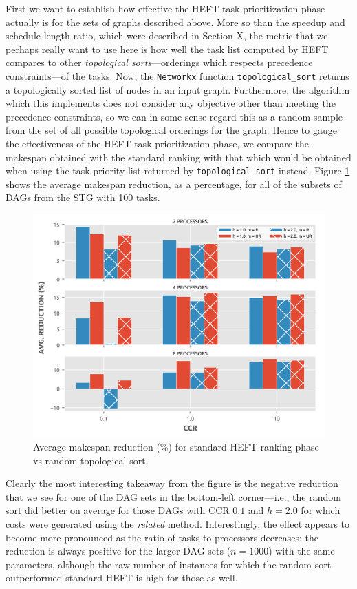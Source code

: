 \documentclass[12pt]{article}
\begin{document}
First we want to establish how effective the HEFT task prioritization phase actually is for the sets of graphs described above. More so than the speedup and schedule length ratio, which were described in Section X, the metric that we perhaps really want to use here is how well the task list computed by HEFT compares to other {\em topological sorts}---orderings which respects precedence constraints---of the tasks. Now, the {\tt Networkx} function {\tt topological\_sort} returns a topologically sorted list of nodes in an input graph. Furthermore, the algorithm which this implements does not consider any objective other than meeting the precedence constraints, so we can in some sense regard this as a random sample from the set of all possible topological orderings for the graph. Hence to gauge the effectiveness of the HEFT task prioritization phase, we compare the makespan obtained with the standard ranking with that which would be obtained when using the task priority list returned by {\tt topological\_sort} instead. Figure \ref{plot.benchmark_reductions_100} shows the average makespan reduction, as a percentage, for all of the subsets of DAGs from the STG with 100 tasks.

\begin{figure}
	\centering	
	\includegraphics[scale=0.8]{100tasks_reductions.png}
	\caption{Average makespan reduction (\%) for standard HEFT ranking phase vs random topological sort.}	
	\label{plot.benchmark_reductions_100}
\end{figure}

Clearly the most interesting takeaway from the figure is the negative reduction that we see for one of the DAG sets in the bottom-left corner---i.e., the random sort did better on average for those DAGs with CCR $0.1$ and $h = 2.0$ for which costs were generated using the {\em related} method. Interestingly, the effect appears to become more pronounced as the ratio of tasks to processors decreases: the reduction is always positive for the larger DAG sets ($n = 1000$) with the same parameters, although the raw number of instances for which the random sort outperformed standard HEFT is high for those as well. 
\end{document}
